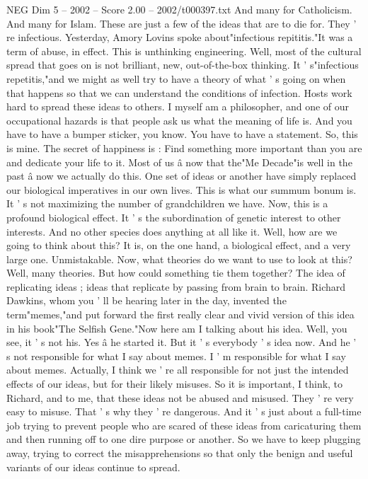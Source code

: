 \begin{textsample}{NEG Dim 5 – 2002 – Score 2.00 – 2002/t000397.txt}
And many for Catholicism.
And many for Islam.
These are just a few of the ideas that are to die for.
They ' re infectious.
Yesterday, Amory Lovins spoke about"infectious repititis."It was a term of abuse, in effect.
This is unthinking engineering.
Well, most of the cultural spread that goes on is not brilliant, new, out-of-the-box thinking.
It ' s"infectious repetitis,"and we might as well try to have a theory of what ' s going on when that happens so that we can understand the conditions of infection.
Hosts work hard to spread these ideas to others.
I myself am a philosopher, and one of our occupational hazards is that people ask us what the meaning of life is.
And you have to have a bumper sticker, you know.
You have to have a statement.
So, this is mine.
The secret of happiness is : Find something more important than you are and dedicate your life to it.
Most of us â now that the"Me Decade"is well in the past â now we actually do this.
One set of ideas or another have simply replaced our biological imperatives in our own lives.
This is what our summum bonum is.
It ' s not maximizing the number of grandchildren we have.
Now, this is a profound biological effect.
It ' s the subordination of genetic interest to other interests.
And no other species does anything at all like it.
Well, how are we going to think about this?
It is, on the one hand, a biological effect, and a very large one.
Unmistakable.
Now, what theories do we want to use to look at this?
Well, many theories.
But how could something tie them together?
The idea of replicating ideas ; ideas that replicate by passing from brain to brain.
Richard Dawkins, whom you ' ll be hearing later in the day, invented the term"memes,"and put forward the first really clear and vivid version of this idea in his book"The Selfish Gene."Now here am I talking about his idea.
Well, you see, it ' s not his.
Yes â he started it.
But it ' s everybody ' s idea now.
And he ' s not responsible for what I say about memes.
I ' m responsible for what I say about memes.
Actually, I think we ' re all responsible for not just the intended effects of our ideas, but for their likely misuses.
So it is important, I think, to Richard, and to me, that these ideas not be abused and misused.
They ' re very easy to misuse.
That ' s why they ' re dangerous.
And it ' s just about a full-time job trying to prevent people who are scared of these ideas from caricaturing them and then running off to one dire purpose or another.
So we have to keep plugging away, trying to correct the misapprehensions so that only the benign and useful variants of our ideas continue to spread.

\end{textsample}
